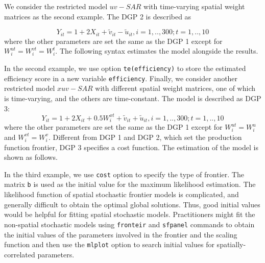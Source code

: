 We consider the restricted model $uv-SAR$ with time-varying spatial weight matrices as the second example. The DGP 2 is described as

\begin{equation}\label{dgp2}
	Y_{it} = 1+2X_{it} + \tilde{v}_{it}-\tilde{u}_{it}, i=1,..,300; t=1,..,10
\end{equation}
where the other parameters are set the same as the DGP 1 except for $W_{i}^{ut}=W_{i}^{vt}=W_{i}^t$. The following syntax estimates the model alongside the results.

\begin{stlog}
	
\end{stlog}

In the second example, we use option {\tt te(efficiency)} to store the estimated efficiency score in a new variable {\tt efficiency}. Finally, we consider another restricted model $xuv-SAR$ with different spatial weight matrices, one of which is time-varying, and the others are time-constant.  The model is described as DGP 3:
\begin{equation}\label{dgp3}
	Y_{it} = 1+2X_{it}+ 0.5W_{i}^{xt} + \tilde{v}_{it}+\tilde{u}_{it}, i=1,..,300; t=1,..,10
\end{equation}
where the other parameters are set the same as the DGP 1 except for $W_{i}^{ut}=W_{i}^u$ and $W_{i}^{vt}=W_{i}^v$.  Different from DGP 1 and DGP 2, which set the production function frontier, DGP 3 specifies a cost function. The estimation of the model is shown as follows.

\begin{stlog}
	
\end{stlog}

In the third example, we use {\tt cost} option to specify the type of frontier.  The matrix {\tt b} is used as the initial value for the maximum likelihood estimation. The likelihood function of spatial stochastic frontier models is complicated, and generally difficult to obtain the optimal global solutions. Thus, good initial values would be helpful for fitting spatial stochastic models. Practitioners might fit the non-spatial stochastic models using  {\tt fronteir} and {\tt sfpanel} commands to obtain the initial values of the parameters involved in the frontier and the scaling function and then use the {\tt mlplot} option to search initial values for spatially-correlated parameters.
 

